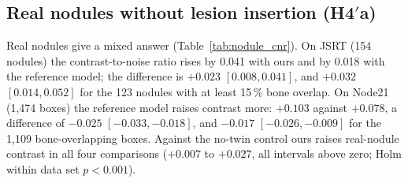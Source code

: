 \subsection{Real nodules without lesion insertion (\texorpdfstring{H4$'$a}{H4'a})}
Real nodules give a mixed answer (Table~\ref{tab:nodule_cnr}). On JSRT (154 nodules) the contrast-to-noise ratio rises by 0.041 with ours
and by 0.018 with the reference model; the difference is $+0.023$ $[0.008,0.041]$, and $+0.032$ $[0.014,0.052]$ for the 123 nodules with at
least 15\,\% bone overlap. On Node21 (1,474 boxes) the reference model raises contrast more: $+0.103$ against $+0.078$, a difference of
$-0.025$ $[-0.033,-0.018]$, and $-0.017$ $[-0.026,-0.009]$ for the 1,109 bone-overlapping boxes. Against the no-twin control ours raises
real-nodule contrast in all four comparisons ($+0.007$ to $+0.027$, all intervals above zero; Holm within data set $p<0.001$).
\begin{table}[htbp]
\centering\small
\caption{Contrast-to-noise change of real nodules on JSRT and Node21 (soft-tissue image minus original), all lesions and lesions with at least
15\,\% bone overlap; image-cluster bootstrap intervals.}
\label{tab:nodule_cnr}
\end{table}

